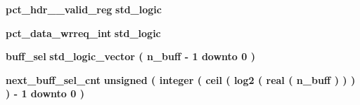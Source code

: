 \begin{DoxyCompactItemize}
\item 
{\bf pct\+\_\+hdr\+\_\+\_\+valid\+\_\+reg} {\bfseries \textcolor{comment}{std\+\_\+logic}\textcolor{vhdlchar}{ }} 
\item 
{\bf pct\+\_\+data\+\_\+wrreq\+\_\+int} {\bfseries \textcolor{comment}{std\+\_\+logic}\textcolor{vhdlchar}{ }} 
\item 
{\bf buff\+\_\+sel} {\bfseries \textcolor{comment}{std\+\_\+logic\+\_\+vector}\textcolor{vhdlchar}{ }\textcolor{vhdlchar}{(}\textcolor{vhdlchar}{ }\textcolor{vhdlchar}{ }\textcolor{vhdlchar}{ }\textcolor{vhdlchar}{ }{\bfseries {\bf n\+\_\+buff}} \textcolor{vhdlchar}{-\/}\textcolor{vhdlchar}{ } \textcolor{vhdldigit}{1} \textcolor{vhdlchar}{ }\textcolor{keywordflow}{downto}\textcolor{vhdlchar}{ }\textcolor{vhdlchar}{ } \textcolor{vhdldigit}{0} \textcolor{vhdlchar}{ }\textcolor{vhdlchar}{)}\textcolor{vhdlchar}{ }} 
\item 
{\bf next\+\_\+buff\+\_\+sel\+\_\+cnt} {\bfseries \textcolor{comment}{unsigned}\textcolor{vhdlchar}{ }\textcolor{vhdlchar}{(}\textcolor{vhdlchar}{ }\textcolor{vhdlchar}{ }\textcolor{vhdlchar}{ }\textcolor{vhdlchar}{ }\textcolor{comment}{integer}\textcolor{vhdlchar}{ }\textcolor{vhdlchar}{(}\textcolor{vhdlchar}{ }\textcolor{vhdlchar}{ceil}\textcolor{vhdlchar}{ }\textcolor{vhdlchar}{(}\textcolor{vhdlchar}{ }\textcolor{vhdlchar}{log2}\textcolor{vhdlchar}{ }\textcolor{vhdlchar}{(}\textcolor{vhdlchar}{ }\textcolor{comment}{real}\textcolor{vhdlchar}{ }\textcolor{vhdlchar}{(}\textcolor{vhdlchar}{ }{\bfseries {\bf n\+\_\+buff}} \textcolor{vhdlchar}{ }\textcolor{vhdlchar}{ }\textcolor{vhdlchar}{)}\textcolor{vhdlchar}{ }\textcolor{vhdlchar}{ }\textcolor{vhdlchar}{ }\textcolor{vhdlchar}{)}\textcolor{vhdlchar}{ }\textcolor{vhdlchar}{ }\textcolor{vhdlchar}{ }\textcolor{vhdlchar}{)}\textcolor{vhdlchar}{ }\textcolor{vhdlchar}{ }\textcolor{vhdlchar}{ }\textcolor{vhdlchar}{)}\textcolor{vhdlchar}{ }\textcolor{vhdlchar}{-\/}\textcolor{vhdlchar}{ } \textcolor{vhdldigit}{1} \textcolor{vhdlchar}{ }\textcolor{keywordflow}{downto}\textcolor{vhdlchar}{ }\textcolor{vhdlchar}{ } \textcolor{vhdldigit}{0} \textcolor{vhdlchar}{ }\textcolor{vhdlchar}{)}\textcolor{vhdlchar}{ }} 
\item 

\end{DoxyCompactItemize}
